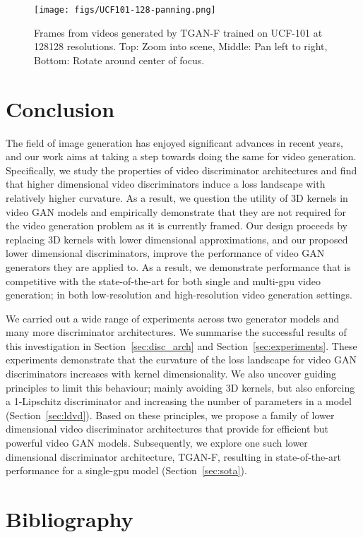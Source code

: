 \documentclass[a4paper,fleqn]{cas-sc}
\begin{document}
\begin{figure}[pos=!h]
    \centering
    \texttt{[image: figs/UCF101-128-panning.png]}
    
    \caption{Frames from videos generated by TGAN-F trained on UCF-101 at
128128 resolutions. Top: Zoom into scene, Middle: Pan left to right, Bottom: Rotate around center of focus.} 
    \label{fig:UCF101_ldvd_128}
\end{figure}


\section{Conclusion}
\label{sec:end}
The field of image generation has enjoyed significant advances in recent years, and our work aims at taking a step towards doing the same for video generation. Specifically, we study the properties of video discriminator architectures and find that higher dimensional video discriminators induce a loss landscape with relatively higher curvature. As a result, we question the utility of 3D kernels in video GAN models and empirically demonstrate that they are not required for the video generation problem as it is currently framed. Our design proceeds by replacing 3D kernels with lower dimensional approximations, and our proposed lower dimensional discriminators, improve the performance of video GAN generators they are applied to. As a result, we demonstrate performance that is competitive with the state-of-the-art for both single and multi-gpu video generation; in both low-resolution and high-resolution video generation settings. 

We carried out a wide range of experiments across two generator models and many more discriminator architectures. We summarise the successful results of this investigation in Section~\ref{sec:disc_arch} and Section~\ref{sec:experiments}. These experiments demonstrate that the curvature of the loss landscape for video GAN discriminators increases with kernel dimensionality. We also uncover guiding principles to limit this behaviour; mainly avoiding 3D kernels, but also enforcing a 1-Lipschitz discriminator and increasing the number of parameters in a model (Section~\ref{sec:ldvd}). Based on these principles, we propose a family of lower dimensional video discriminator architectures that provide for efficient but powerful video GAN models. Subsequently, we explore one such lower dimensional discriminator architecture, TGAN-F, resulting in state-of-the-art performance for a single-gpu model (Section~\ref{sec:sota}).\\


\clearpage
\section{Bibliography}




\end{document}
